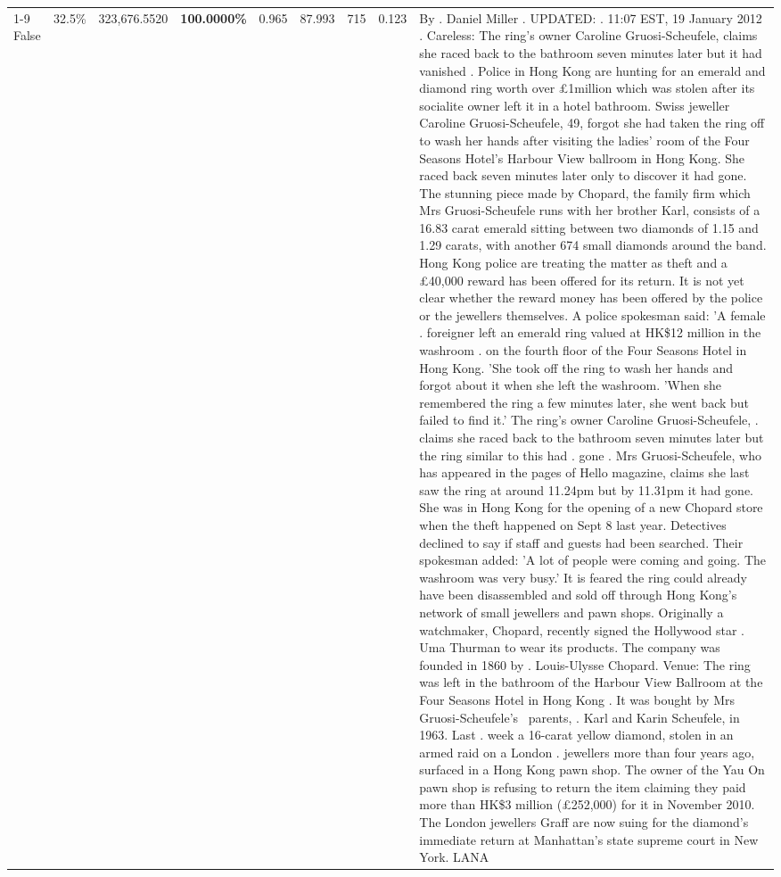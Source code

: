 \begin{table}[H]
\begin{tabular}{lllrlllll}
\cline{1-9} \cline{2-9}
False & 32.5\% & 323,676.5520 & \bfseries \color{red} 100.0000\% & 0.965 & 87.993 & 715 & 0.123 & By . Daniel Miller . UPDATED: . 11:07 EST, 19 January 2012 . Careless: The ring's owner Caroline Gruosi-Scheufele, claims she raced back to the bathroom seven minutes later but it had vanished . Police in Hong Kong are hunting for an emerald and diamond ring worth over £1million which was stolen after its socialite owner left it in a hotel bathroom. Swiss jeweller Caroline Gruosi-Scheufele, 49, forgot she had taken the ring off to wash her hands after visiting the ladies' room of the Four Seasons Hotel's Harbour View ballroom in Hong Kong. She raced back seven minutes later only to discover it had gone. The stunning piece made by Chopard, the family firm which Mrs Gruosi-Scheufele runs with her brother Karl, consists of a 16.83 carat emerald sitting between two diamonds of 1.15 and 1.29 carats, with another 674 small diamonds around the band. Hong Kong police are treating the matter as theft and a £40,000 reward has been offered for its return. It is not yet clear whether the reward money has been offered by the police or the jewellers themselves. A police spokesman said: 'A female . foreigner left an emerald ring valued at HK\$12 million in the washroom . on the fourth floor of the Four Seasons Hotel in Hong Kong. 'She took off the ring to wash her hands and forgot about it when she left the washroom. 'When she remembered the ring a few minutes later, she went back but failed to find it.' The ring's owner Caroline Gruosi-Scheufele, . claims she raced back to the bathroom seven minutes later but the ring similar to this had . gone . Mrs Gruosi-Scheufele, who has appeared in the pages of Hello magazine, claims she last saw the ring at around 11.24pm but by 11.31pm it had gone. She was in Hong Kong for the opening of a new Chopard store when the theft happened on Sept 8 last year. Detectives declined to say if staff and guests had been searched. Their spokesman added: 'A lot of people were coming and going. The washroom was very busy.' It is feared the ring could already have been disassembled and sold off through Hong Kong's network of small jewellers and pawn shops. Originally a watchmaker, Chopard, recently signed the Hollywood star . Uma Thurman to wear its products. The company was founded in 1860 by . Louis-Ulysse Chopard. Venue: The ring was left in the bathroom of the Harbour View Ballroom at the Four Seasons Hotel in Hong Kong . It was bought by Mrs Gruosi-Scheufele's  parents, . Karl and Karin Scheufele, in 1963. Last . week a 16-carat yellow diamond, stolen in an armed raid on a London . jewellers more than four years ago, surfaced in a Hong Kong pawn shop. The owner of the Yau On pawn shop is refusing to return the item claiming they paid more than HK\$3 million (£252,000) for it in November 2010. The London jewellers Graff are now suing for the diamond’s immediate return at Manhattan’s state supreme court in New York. LANA \\

\end{tabular}
\end{table}
